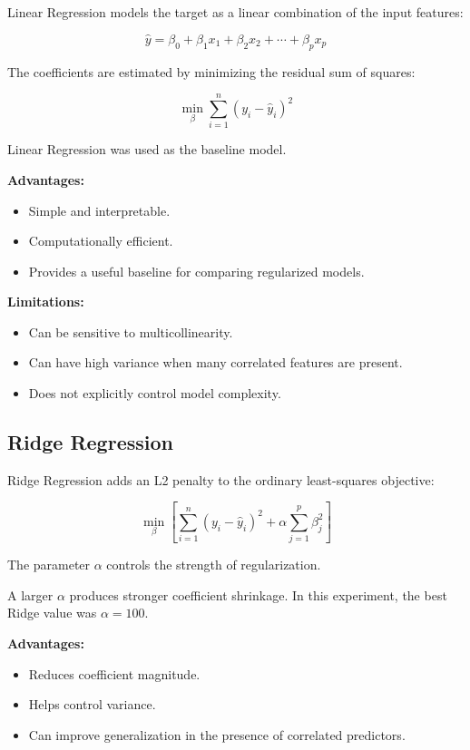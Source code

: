 \documentclass[12pt,a4paper]{article}
\begin{document}
Linear Regression models the target as a linear combination of the input features:

\[
\hat{y} = \beta_0 + \beta_1x_1+\beta_2x_2+\cdots+\beta_px_p
\]

The coefficients are estimated by minimizing the residual sum of squares:

\[
\min_{\beta}
\sum_{i=1}^{n}(y_i-\hat{y}_i)^2
\]

Linear Regression was used as the baseline model.

\textbf{Advantages:}

\begin{itemize}
    \item Simple and interpretable.
    \item Computationally efficient.
    \item Provides a useful baseline for comparing regularized models.
\end{itemize}

\textbf{Limitations:}

\begin{itemize}
    \item Can be sensitive to multicollinearity.
    \item Can have high variance when many correlated features are present.
    \item Does not explicitly control model complexity.
\end{itemize}

\subsection{Ridge Regression}

Ridge Regression adds an L2 penalty to the ordinary least-squares objective:

\[
\min_{\beta}
\left[
\sum_{i=1}^{n}(y_i-\hat{y}_i)^2
+
\alpha\sum_{j=1}^{p}\beta_j^2
\right]
\]

The parameter $\alpha$ controls the strength of regularization.

A larger $\alpha$ produces stronger coefficient shrinkage. In this experiment, the best Ridge value was $\alpha=100$.

\textbf{Advantages:}

\begin{itemize}
    \item Reduces coefficient magnitude.
    \item Helps control variance.
    \item Can improve generalization in the presence of correlated predictors.
\end{itemize}
\end{document}
